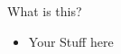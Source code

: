 
\begin{frame}[t,plain]
\titlepage
\end{frame}


\begin{frame}[t]{What is this?}
\begin{itemize}
\item Your Stuff here
\end{itemize}
\end{frame}

